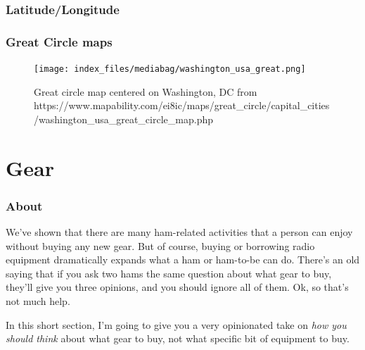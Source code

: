 \documentclass[
  letterpaper,
  DIV=11,
  numbers=noendperiod]{scrreport}
\begin{document}
\hypertarget{latitudelongitude}{%
\section*{Latitude/Longitude}\label{latitudelongitude}}


\hypertarget{great-circle-maps}{%
\section*{Great Circle maps}\label{great-circle-maps}}


\begin{figure}

{\centering \texttt{[image: index\_files/mediabag/washington\_usa\_great.png]}

}

\caption{Great circle map centered on Washington, DC from
https://www.mapability.com/ei8ic/maps/great\_circle/capital\_cities/washington\_usa\_great\_circle\_map.php}

\end{figure}

\part{Gear}

\hypertarget{about-5}{%
\section*{About}\label{about-5}}


We've shown that there are many ham-related activities that a person can
enjoy without buying any new gear. But of course, buying or borrowing
radio equipment dramatically expands what a ham or ham-to-be can do.
There's an old saying that if you ask two hams the same question about
what gear to buy, they'll give you three opinions, and you should ignore
all of them. Ok, so that's not much help.

In this short section, I'm going to give you a very opinionated take on
\emph{how you should think} about what gear to buy, not what specific
bit of equipment to buy.
\end{document}
